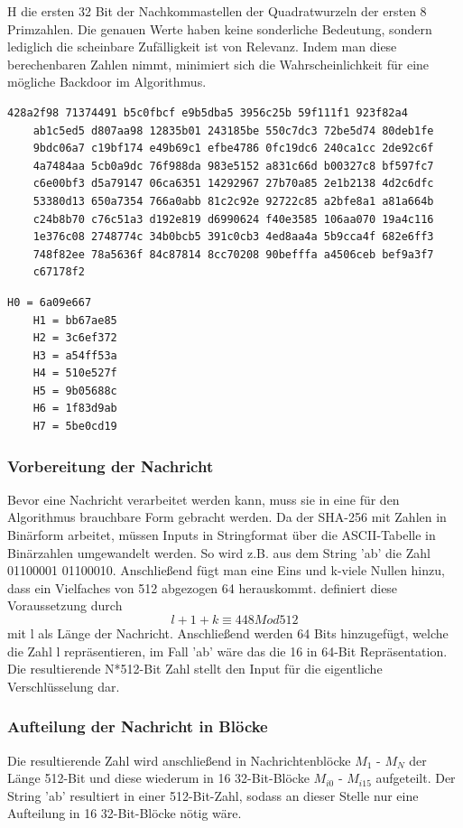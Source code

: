 H die ersten 32 Bit der Nachkommastellen der Quadratwurzeln der ersten 8 Primzahlen. 
 Die genauen Werte haben keine sonderliche Bedeutung, sondern lediglich die scheinbare Zufälligkeit ist von Relevanz. Indem man diese berechenbaren Zahlen nimmt, minimiert sich die Wahrscheinlichkeit für eine mögliche Backdoor im Algorithmus.
\begin{lstlisting}[caption={Liste K von Konstanten},captionpos=b]
	428a2f98 71374491 b5c0fbcf e9b5dba5 3956c25b 59f111f1 923f82a4 
	ab1c5ed5 d807aa98 12835b01 243185be 550c7dc3 72be5d74 80deb1fe 
	9bdc06a7 c19bf174 e49b69c1 efbe4786 0fc19dc6 240ca1cc 2de92c6f 
	4a7484aa 5cb0a9dc 76f988da 983e5152 a831c66d b00327c8 bf597fc7
	c6e00bf3 d5a79147 06ca6351 14292967 27b70a85 2e1b2138 4d2c6dfc
	53380d13 650a7354 766a0abb 81c2c92e 92722c85 a2bfe8a1 a81a664b 
	c24b8b70 c76c51a3 d192e819 d6990624 f40e3585 106aa070 19a4c116 
	1e376c08 2748774c 34b0bcb5 391c0cb3 4ed8aa4a 5b9cca4f 682e6ff3 
	748f82ee 78a5636f 84c87814 8cc70208 90befffa a4506ceb bef9a3f7 
	c67178f2
\end{lstlisting}
\begin{lstlisting}[caption={Liste H mit den Arbeitsvariablen H0 - H7},captionpos=b]
	H0 = 6a09e667
	H1 = bb67ae85
	H2 = 3c6ef372
	H3 = a54ff53a
	H4 = 510e527f
	H5 = 9b05688c
	H6 = 1f83d9ab
	H7 = 5be0cd19
\end{lstlisting}

\subsubsection{Vorbereitung der Nachricht}
Bevor eine Nachricht verarbeitet werden kann, muss sie in eine für den Algorithmus brauchbare Form gebracht werden. 
Da der SHA-256 mit Zahlen in Binärform arbeitet, müssen Inputs in Stringformat über die ASCII-Tabelle in Binärzahlen umgewandelt werden. So wird z.B. aus dem String 'ab' die Zahl 01100001 01100010.
Anschließend fügt man eine Eins und k-viele Nullen hinzu, dass ein Vielfaches von 512 abgezogen 64 herauskommt. \cite{dang_2015} definiert diese Voraussetzung durch
$$l+1+k \equiv 448 Mod512$$
mit l als Länge der Nachricht. Anschließend werden 64 Bits hinzugefügt, welche die Zahl l repräsentieren, im Fall 'ab' wäre das die 16 in 64-Bit Repräsentation. Die resultierende N*512-Bit Zahl stellt den Input für die eigentliche Verschlüsselung dar.

\subsubsection{Aufteilung der Nachricht in Blöcke}
Die resultierende Zahl wird anschließend in Nachrichtenblöcke $M_1$ - $M_N$ der Länge 512-Bit und diese wiederum in 16 32-Bit-Blöcke $M_{i0}$ - $M_{i15}$ aufgeteilt. Der String 'ab' resultiert in einer 512-Bit-Zahl, sodass an dieser Stelle nur eine Aufteilung in 16 32-Bit-Blöcke nötig wäre.

